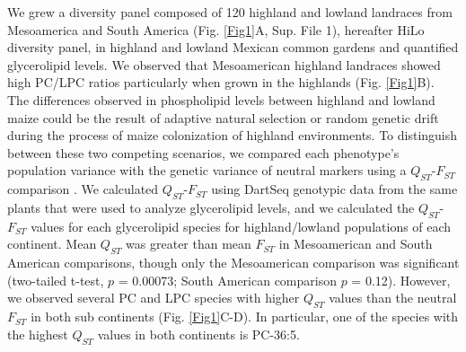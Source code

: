 \documentclass[9pt,twocolumn,twoside,lineno]{BioRxiv}
\begin{document}
We grew a diversity panel composed of 120 highland and lowland landraces from Mesoamerica and South America (Fig. \ref{Fig1}A, Sup. File 1), hereafter HiLo diversity panel, in highland and lowland Mexican common gardens and quantified glycerolipid levels.    
We observed that Mesoamerican highland landraces showed  high PC/LPC ratios  particularly when grown in the highlands (Fig. \ref{Fig1}B).
The differences observed in phospholipid levels between highland and lowland maize could be the result of adaptive natural selection or random genetic drift during the process of maize colonization of highland environments.
To distinguish between these two competing scenarios, we compared each phenotype’s population variance with the genetic variance of neutral markers using a $Q_{ST}$-$F_{ST}$ comparison \cite{Leinonen2013-ic}.
We calculated $Q_{ST}$-$F_{ST}$ using DartSeq genotypic data from the same plants that were used to analyze glycerolipid levels, and we calculated the $Q_{ST}$-$F_{ST}$ values for each glycerolipid species for highland/lowland populations of each continent. 
Mean $Q_{ST}$ was greater than mean $F_{ST}$ in Mesoamerican and South American comparisons, though only the Mesoamerican comparison was significant (two-tailed t-test, $p$ = 0.00073; South American comparison $p$ = 0.12).
However, we observed several PC and LPC species with higher $Q_{ST}$ values than the neutral $F_{ST}$ in both sub continents (Fig. \ref{Fig1}C-D).
In particular, one of the species with the highest $Q_{ST}$ values in both continents is PC-36:5. 
\end{document}
